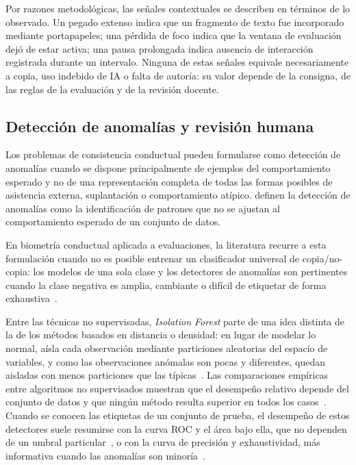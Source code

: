 Por razones metodológicas, las señales contextuales se describen en términos de lo observado. Un pegado extenso indica que un fragmento de texto fue incorporado mediante portapapeles; una pérdida de foco indica que la ventana de evaluación dejó de estar activa; una pausa prolongada indica ausencia de interacción registrada durante un intervalo. Ninguna de estas señales equivale necesariamente a copia, uso indebido de IA o falta de autoría: su valor depende de la consigna, de las reglas de la evaluación y de la revisión docente.

\subsection{Detección de anomalías y revisión humana}
\label{sec:deteccion_anomalias}

Los problemas de consistencia conductual pueden formularse como detección de anomalías cuando se dispone principalmente de ejemplos del comportamiento esperado y no de una representación completa de todas las formas posibles de asistencia externa, suplantación o comportamiento atípico. \textcite{Chandola2009} definen la detección de anomalías como la identificación de patrones que no se ajustan al comportamiento esperado de un conjunto de datos.

En biometría conductual aplicada a evaluaciones, la literatura recurre a esta formulación cuando no es posible entrenar un clasificador universal de copia/no-copia: los modelos de una sola clase y los detectores de anomalías son pertinentes cuando la clase negativa es amplia, cambiante o difícil de etiquetar de forma exhaustiva~\parencite{Chandola2009}.

Entre las técnicas no supervisadas, \textit{Isolation Forest} parte de una idea distinta de la de los métodos basados en distancia o densidad: en lugar de modelar lo normal, aísla cada observación mediante particiones aleatorias del espacio de variables, y como las observaciones anómalas son pocas y diferentes, quedan aisladas con menos particiones que las típicas~\parencite{Liu2008, Liu2012}. Las comparaciones empíricas entre algoritmos no supervisados muestran que el desempeño relativo depende del conjunto de datos y que ningún método resulta superior en todos los casos~\parencite{Goldstein2016, Campos2016}. Cuando se conocen las etiquetas de un conjunto de prueba, el desempeño de estos detectores suele resumirse con la curva ROC y el área bajo ella, que no dependen de un umbral particular~\parencite{Fawcett2006}, o con la curva de precisión y exhaustividad, más informativa cuando las anomalías son minoría~\parencite{Saito2015}.

